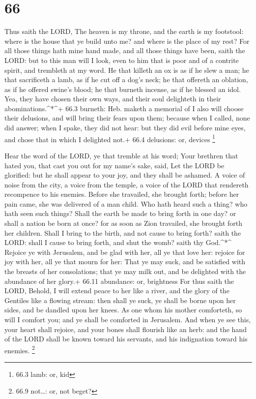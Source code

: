 \hypertarget{section-65}{%
\section{66}\label{section-65}}

 Thus saith the LORD, The heaven is my throne, and the earth
is my footstool: where is the house that ye build unto me? and where is
the place of my rest?  For all those things hath mine hand
made, and all those things have been, saith the LORD: but to this man
will I look, even to him that is poor and of a contrite spirit, and
trembleth at my word.  He that killeth an ox is as if he
slew a man; he that sacrificeth a lamb, as if he cut off a dog's neck;
he that offereth an oblation, as if he offered swine's blood; he that
burneth incense, as if he blessed an idol. Yea, they have chosen their
own ways, and their soul delighteth in their abominations.\^{}*\^{}+
66.3 burneth: Heb. maketh a memorial of  I also will choose
their delusions, and will bring their fears upon them; because when I
called, none did answer; when I spake, they did not hear: but they did
evil before mine eyes, and chose that in which I delighted not.+ 66.4
delusions: or, devices \footnote{66.3 lamb: or, kid}

 Hear the word of the LORD, ye that tremble at his word;
Your brethren that hated you, that cast you out for my name's sake,
said, Let the LORD be glorified: but he shall appear to your joy, and
they shall be ashamed.  A voice of noise from the city, a
voice from the temple, a voice of the LORD that rendereth recompence to
his enemies.  Before she travailed, she brought forth;
before her pain came, she was delivered of a man child.  Who
hath heard such a thing? who hath seen such things? Shall the earth be
made to bring forth in one day? or shall a nation be born at once? for
as soon as Zion travailed, she brought forth her children. 
Shall I bring to the birth, and not cause to bring forth? saith the
LORD: shall I cause to bring forth, and shut the womb? saith thy
God.\^{}*\^{}  Rejoice ye with Jerusalem, and be glad with
her, all ye that love her: rejoice for joy with her, all ye that mourn
for her:  That ye may suck, and be satisfied with the
breasts of her consolations; that ye may milk out, and be delighted with
the abundance of her glory.+ 66.11 abundance: or, brightness
 For thus saith the LORD, Behold, I will extend peace to
her like a river, and the glory of the Gentiles like a flowing stream:
then shall ye suck, ye shall be borne upon her sides, and be dandled
upon her knees.  As one whom his mother comforteth, so will
I comfort you; and ye shall be comforted in Jerusalem.  And
when ye see this, your heart shall rejoice, and your bones shall
flourish like an herb: and the hand of the LORD shall be known toward
his servants, and his indignation toward his enemies. \footnote{66.9
  not\ldots: or, not beget?}

